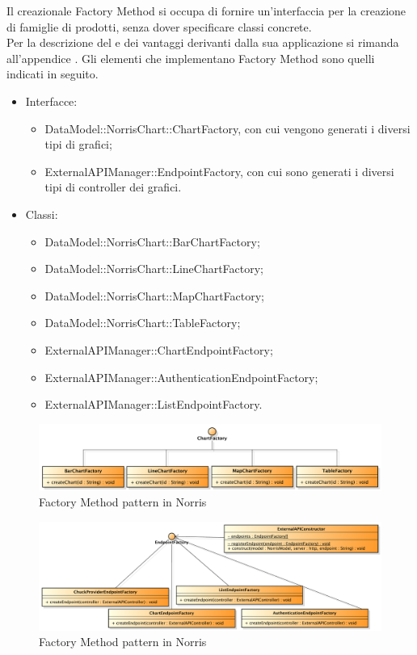 				Il  creazionale Factory Method si occupa di fornire un'interfaccia per la creazione di famiglie di prodotti, senza dover specificare classi concrete.\\
		Per la descrizione del  e dei vantaggi derivanti dalla sua applicazione si rimanda all'appendice .
					Gli elementi che implementano Factory Method sono quelli indicati in seguito.
					\begin{itemize}
						\item Interfacce:
						\begin{itemize}
							\item DataModel::NorrisChart::ChartFactory, con cui vengono generati i diversi tipi di grafici;
							\item ExternalAPIManager::EndpointFactory, con cui sono generati i diversi tipi di controller dei grafici.
						\end{itemize}
						\item Classi:
						\begin{itemize}
							\item DataModel::NorrisChart::BarChartFactory;
							\item DataModel::NorrisChart::LineChartFactory;
							\item DataModel::NorrisChart::MapChartFactory;
							\item DataModel::NorrisChart::TableFactory;
							\item ExternalAPIManager::ChartEndpointFactory;
							\item ExternalAPIManager::AuthenticationEndpointFactory;
							\item ExternalAPIManager::ListEndpointFactory.
						\end{itemize}
					\end{itemize}
					\begin{figure}[H]\centering
	        		\includegraphics[width=\textwidth]{SpecificaTecnica/Pics/DesignPatternNorris/Factory2}
	        		\caption{Factory Method pattern in Norris}
	    			\end{figure}
	    			\begin{figure}[H]\centering
	        			\includegraphics[width=\textwidth]{SpecificaTecnica/Pics/DesignPatternNorris/Factory1}
	        			\caption{Factory Method pattern in Norris}
	    			\end{figure}
			
